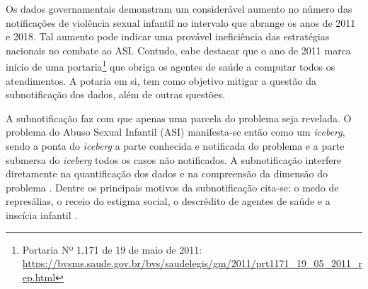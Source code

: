 
Os dados governamentais demonstram um considerável aumento no número das notificações de violência sexual infantil no intervalo que abrange os anos de 2011 e 2018. Tal aumento pode indicar uma provável ineficiência das estratégias nacionais no combate ao ASI. Contudo, cabe destacar que o ano de 2011 marca início de uma portaria\footnote{Portaria Nº 1.171 de 19 de maio de 2011: \url{https://bvsms.saude.gov.br/bvs/saudelegis/gm/2011/prt1171_19_05_2011_rep.html}} que obriga os agentes de saúde a computar todos os atendimentos. A potaria em si, tem como objetivo mitigar a questão da subnotificação dos dados, além de outras questões.


A subnotificação faz com que apenas uma parcela do problema seja revelada. O problema do Abuso Sexual Infantil (ASI) manifesta-se então como um \textit{iceberg}, sendo a ponta do \textit{iceberg} a parte conhecida e notificada do problema e a parte submersa do \textit{iceberg} todos os casos não notificados. A subnotificação interfere diretamente na quantificação dos dados e na compreensão da dimensão do problema \cite{deslandes2016atendimento, da2017violencia}. Dentre os principais motivos da subnotificação cita-se: o medo de represálias, o receio do estigma social, o descrédito de agentes de saúde e a inscícia infantil \cite{publica2019sao, pavao2013impasse}.


